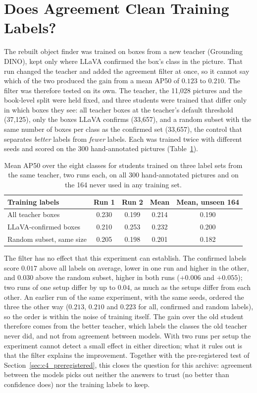 \section{Does Agreement Clean Training Labels?}
\label{sec:label_filter}

The rebuilt object finder was trained on boxes from a new teacher (Grounding DINO), kept only where LLaVA confirmed the box's class in the picture. That run changed the teacher and added the agreement filter at once, so it cannot say which of the two produced the gain from a mean AP50 of $0.123$ to $0.210$. The filter was therefore tested on its own. The teacher, the 11,028 pictures and the book-level split were held fixed, and three students were trained that differ only in which boxes they see: all teacher boxes at the teacher's default threshold (37,125), only the boxes LLaVA confirms (33,657), and a random subset with the same number of boxes per class as the confirmed set (33,657), the control that separates \emph{better} labels from \emph{fewer} labels. Each was trained twice with different seeds and scored on the 300 hand-annotated pictures (Table~\ref{tab:label_filter}).

\begin{table}[!htbp]
\centering
\caption[Students trained on three label sets]{Mean AP50 over the eight classes for students trained on three label sets from the same teacher, two runs each, on all 300 hand-annotated pictures and on the 164 never used in any training set.}
\label{tab:label_filter}
\begin{tabular}{lcccc}
\toprule
Training labels & Run 1 & Run 2 & Mean & Mean, unseen 164 \\
\midrule
All teacher boxes & 0.230 & 0.199 & 0.214 & 0.190 \\
LLaVA-confirmed boxes & 0.210 & 0.253 & 0.232 & 0.200 \\
Random subset, same size & 0.205 & 0.198 & 0.201 & 0.182 \\
\bottomrule
\end{tabular}
\end{table}

The filter has no effect that this experiment can establish. The confirmed labels score $0.017$ above all labels on average, lower in one run and higher in the other, and $0.030$ above the random subset, higher in both runs ($+0.006$ and $+0.055$); two runs of one setup differ by up to $0.04$, as much as the setups differ from each other. An earlier run of the same experiment, with the same seeds, ordered the three the other way ($0.213$, $0.210$ and $0.223$ for all, confirmed and random labels), so the order is within the noise of training itself. The gain over the old student therefore comes from the better teacher, which labels the classes the old teacher never did, and not from agreement between models. With two runs per setup the experiment cannot detect a small effect in either direction; what it rules out is that the filter explains the improvement. Together with the pre-registered test of Section~\ref{sec:c4_preregistered}, this closes the question for this archive: agreement between the models picks out neither the answers to trust (no better than confidence does) nor the training labels to keep.

